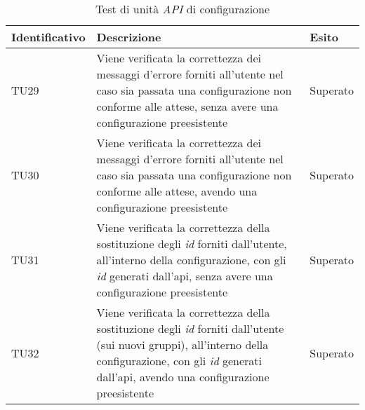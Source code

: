 {
\centering
\begin{longtable}{L{3cm} L{8.5cm} L{2cm}}
\caption{Test di unità \textit{API} di configurazione}\\
\textbf{Identificativo} &
\textbf{Descrizione}&
\textbf{Esito}\\
\endhead
\hline
TU29 & Viene verificata la correttezza dei messaggi d'errore forniti all'utente nel caso sia passata una configurazione non conforme alle attese, senza avere una configurazione preesistente  & Superato\\
\hline
TU30 & Viene verificata la correttezza dei messaggi d'errore forniti all'utente nel caso sia passata una configurazione non conforme alle attese, avendo una configurazione preesistente & Superato\\
\hline
TU31 & Viene verificata la correttezza della sostituzione degli \textit{id} forniti dall'utente, all'interno della configurazione, con gli \textit{id} generati dall'\gls{api}, senza avere una configurazione preesistente & Superato\\
\hline
TU32 & Viene verificata la correttezza della sostituzione degli \textit{id} forniti dall'utente (sui nuovi gruppi), all'interno della configurazione, con gli \textit{id} generati dall'\gls{api}, avendo una configurazione preesistente & Superato\\
\hline
\end{longtable}
}

